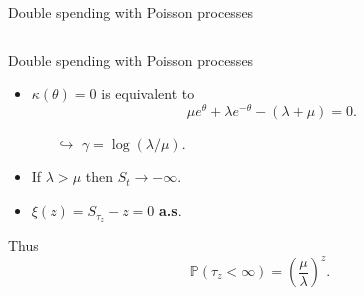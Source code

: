 \documentclass{beamer}
\begin{document}
\begin{frame}{Double spending with Poisson processes}
\begin{columns}
\begin{column}{0.5\textwidth}
\end{column}
\end{columns}
\end{frame}
\begin{frame}{Double spending with Poisson processes}
\scriptsize
\begin{itemize}
\item $\kappa(\theta)=0$ is equivalent to
$$
\mu e^{\theta}+\lambda e^{-\theta}-(\lambda+\mu)=0.
$$

\begin{itemize}
\item[$\hookrightarrow$] $\gamma=\log(\lambda/\mu).$
\end{itemize}
\item If $\lambda>\mu$ then $S_t\rightarrow - \infty$.
\item $\xi(z)=S_{\tau_z}-z=0$ \textbf{a.s}.
\end{itemize}
Thus
$$\mathbb{P}(\tau_z<\infty)=\left(\frac{\mu}{\lambda}\right)^{z}.$$

\end{frame}
\end{document}
